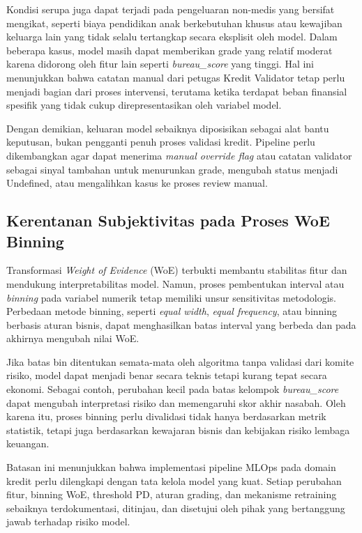 Kondisi serupa juga dapat terjadi pada pengeluaran non-medis yang bersifat mengikat, seperti biaya pendidikan anak berkebutuhan khusus atau kewajiban keluarga lain yang tidak selalu tertangkap secara eksplisit oleh model. Dalam beberapa kasus, model masih dapat memberikan grade yang relatif moderat karena didorong oleh fitur lain seperti \textit{bureau\_score} yang tinggi. Hal ini menunjukkan bahwa catatan manual dari petugas Kredit Validator tetap perlu menjadi bagian dari proses intervensi, terutama ketika terdapat beban finansial spesifik yang tidak cukup direpresentasikan oleh variabel model.

Dengan demikian, keluaran model sebaiknya diposisikan sebagai alat bantu keputusan, bukan pengganti penuh proses validasi kredit. Pipeline perlu dikembangkan agar dapat menerima \textit{manual override flag} atau catatan validator sebagai sinyal tambahan untuk menurunkan grade, mengubah status menjadi Undefined, atau mengalihkan kasus ke proses review manual.

\subsection{Kerentanan Subjektivitas pada Proses WoE Binning}
Transformasi \textit{Weight of Evidence} (WoE) terbukti membantu stabilitas fitur dan mendukung interpretabilitas model. Namun, proses pembentukan interval atau \textit{binning} pada variabel numerik tetap memiliki unsur sensitivitas metodologis. Perbedaan metode binning, seperti \textit{equal width}, \textit{equal frequency}, atau binning berbasis aturan bisnis, dapat menghasilkan batas interval yang berbeda dan pada akhirnya mengubah nilai WoE.

Jika batas bin ditentukan semata-mata oleh algoritma tanpa validasi dari komite risiko, model dapat menjadi benar secara teknis tetapi kurang tepat secara ekonomi. Sebagai contoh, perubahan kecil pada batas kelompok \textit{bureau\_score} dapat mengubah interpretasi risiko dan memengaruhi skor akhir nasabah. Oleh karena itu, proses binning perlu divalidasi tidak hanya berdasarkan metrik statistik, tetapi juga berdasarkan kewajaran bisnis dan kebijakan risiko lembaga keuangan.

Batasan ini menunjukkan bahwa implementasi pipeline MLOps pada domain kredit perlu dilengkapi dengan tata kelola model yang kuat. Setiap perubahan fitur, binning WoE, threshold PD, aturan grading, dan mekanisme retraining sebaiknya terdokumentasi, ditinjau, dan disetujui oleh pihak yang bertanggung jawab terhadap risiko model.

